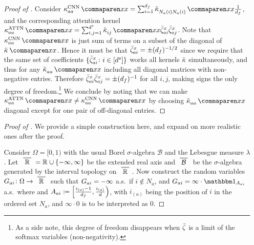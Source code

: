 \begin{proof}[Proof of ]
    Consider $\kernelf{aa}{\text{CNN}}{\inputSymbol}{\inputSymbol} = \sum_{i = 1}^{\genericDimenstion_f} \kerntildef{N_a(i) N_a(i)}{}{\inputSymbol}{\inputSymbol} \frac{1}{\genericDimenstion_f}$, and the corresponding attention kernel $\kernelf{aa}{\text{ATTN}}{\inputSymbol}{\inputSymbol} = \sum_{i, j=1}^{\spatialDimension} \kerntildef{i j}{}{\inputSymbol}{\inputSymbol} \softmaxMean_{ai}^{\inputSymbol} \softmaxMean_{aj}^{\inputSymbol}$.
    Note that $\kernelf{aa}{\text{CNN}}{\inputSymbol}{\inputSymbol}$ is just sum of terms on a subset of the diagonal of $\kerntildef{}{}{\inputSymbol}{\inputSymbol}$.
    Hence it must be that $\bar{\zeta}_{ai}^{x} = \pm (d_f)^{-1/2}$ since we require that the same set of coefficients $\{ \bar{\zeta}_{ai}^x \colon i \in [d^s] \}$ works all kernels $\tilde{\kappa}$ simultaneously, and thus for any $\kerntildef{aa}{}{\inputSymbol}{\inputSymbol}$ including all diagonal matrices with non-negative entries. 
    Therefore $\bar{\zeta}_{ai}^{x} \bar{\zeta}_{aj}^{x} = \pm (d_f)^{-1}$ for all $i, j$, making signs the only degree of freedom.\footnote{As a side note, this degree of freedom disappears when $\bar{\zeta}$ is a limit of the softmax variables (non-negativity).}
    We conclude by noting that we can make $\kernelf{aa}{\text{ATTN}}{\inputSymbol}{\inputSymbol} \neq \kernelf{aa}{\text{CNN}}{\inputSymbol}{\inputSymbol}$ by choosing $\kerntildef{aa}{}{\inputSymbol}{\inputSymbol}$ diagonal except for one pair of off-diagonal entries.
\end{proof}


\sqrtConvRecover*

\begin{proof}[Proof of ]
    We provide a simple construction here, and expand on more realistic ones after the proof.
    
    Consider $\Omega = [0, 1)$ with the usual Borel $\sigma$-algebra $\mathcal{B}$ and the Lebesgue measure $\lambda$.
    Let $\xbar{\mathbb{R}} = \R{} \cup \{-\infty, \infty \}$ be the extended real axis and $\xbar{\mathcal{B}}$ be the $\sigma$-algebra generated by the interval topology on $\xbar{\mathbb{R}}$.
    Now construct the random variables $\logitSymbol_{ai} \colon \Omega \to \xbar{\mathbb{R}}$ such that $G_{ai} = - \infty$ a.s.\ if $i \notin N_a$, and $\logitSymbol_{ai} = \infty \cdot \indicator{A_{ai}}$ a.s.\ where and $A_{a i} \coloneqq \left[\frac{i_{(a)} - 1}{d_f}, \frac{i_{(a)}}{d}\right)$, with $i_{(a)}$ being the position of $i$ in the ordered set $N_a$, and $\infty \cdot 0$ is to be interpreted as $0$.
\end{proof}

